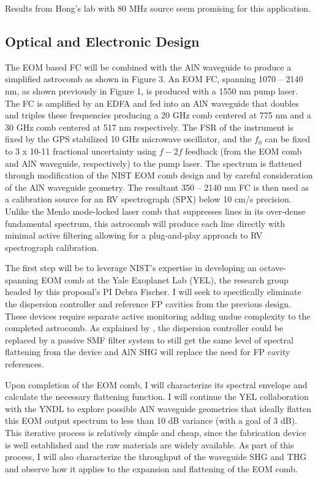 \documentclass[11pt]{article}
\begin{document}
Results from Hong's lab with 80 MHz source seem promising for this application.

\subsection{Optical and Electronic Design}

The EOM based FC will be combined with the AlN waveguide to produce a simplified astrocomb as shown in Figure 3. An EOM FC, spanning 1070 – 2140 nm, as shown previously in Figure 1, is produced with a 1550 nm pump laser. The FC is amplified by an EDFA and fed into an AlN waveguide that doubles and triples these frequencies producing a 20 GHz comb centered at 775 nm and a 30 GHz comb centered at 517 nm respectively. The FSR of the instrument is fixed by the GPS stabilized 10 GHz microwave oscillator, and the $f_0$ can be fixed to 3 x 10-11 fractional uncertainty using $f-2f$ feedback (from the EOM comb and AlN waveguide, respectively) to the pump laser. The spectrum is flattened through modification of the NIST EOM comb design and by careful consideration of the AlN waveguide geometry. The resultant 350 – 2140 nm FC is then used as a calibration source for an RV spectrograph (SPX) below 10 cm/s precision. Unlike the Menlo mode-locked laser comb that suppresses lines in its over-dense fundamental spectrum, this astrocomb will produce each line directly with minimal active filtering allowing for a plug-and-play approach to RV spectrograph calibration.

The first step will be to leverage NIST’s expertise in developing an octave-spanning EOM comb at the Yale Exoplanet Lab (YEL), the research group headed by this proposal’s PI Debra Fischer. I will seek to specifically eliminate the dispersion controller and reference FP cavities from the previous design. These devices require separate active monitoring adding undue complexity to the completed astrocomb. As explained by \cite{Beha2017}, the dispersion controller could be replaced by a passive SMF filter system to still get the same level of spectral flattening from the device and AlN SHG will replace the need for FP cavity references.

Upon completion of the EOM comb, I will characterize its spectral envelope and calculate the necessary flattening function. I will continue the YEL collaboration with the YNDL to explore possible AlN waveguide geometries that ideally flatten this EOM output spectrum to less than 10 dB variance (with a goal of 3 dB). This iterative process is relatively simple and cheap, since the fabrication device is well established and the raw materials are widely available. As part of this process, I will also characterize the throughput of the waveguide SHG and THG and observe how it applies to the expansion and flattening of the EOM comb.
\end{document}
